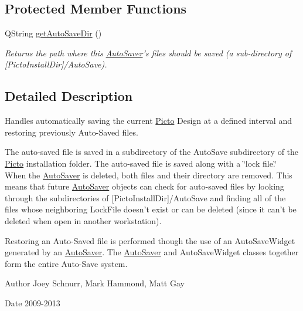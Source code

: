 \subsection*{Protected Member Functions}
\begin{DoxyCompactItemize}
\item 
\hypertarget{class_picto_1_1_auto_saver_a09344b067f544c9f860493e210baf2af}{Q\-String \hyperlink{class_picto_1_1_auto_saver_a09344b067f544c9f860493e210baf2af}{get\-Auto\-Save\-Dir} ()}\label{class_picto_1_1_auto_saver_a09344b067f544c9f860493e210baf2af}

\begin{DoxyCompactList}\small\item\em Returns the path where this \hyperlink{class_picto_1_1_auto_saver}{Auto\-Saver}'s files should be saved (a sub-\/directory of \mbox{[}Picto\-Install\-Dir\mbox{]}/\-Auto\-Save). \end{DoxyCompactList}\end{DoxyCompactItemize}


\subsection{Detailed Description}
Handles automatically saving the current \hyperlink{namespace_picto}{Picto} Design at a defined interval and restoring previously Auto-\/\-Saved files. 

The auto-\/saved file is saved in a subdirectory of the Auto\-Save subdirectory of the \hyperlink{namespace_picto}{Picto} installation folder. The auto-\/saved file is saved along with a \char`\"{}lock file.\char`\"{} When the \hyperlink{class_picto_1_1_auto_saver}{Auto\-Saver} is deleted, both files and their directory are removed. This means that future \hyperlink{class_picto_1_1_auto_saver}{Auto\-Saver} objects can check for auto-\/saved files by looking through the subdirectories of \mbox{[}Picto\-Install\-Dir\mbox{]}/\-Auto\-Save and finding all of the files whose neighboring Lock\-File doesn't exist or can be deleted (since it can't be deleted when open in another workstation).

Restoring an Auto-\/\-Saved file is performed though the use of an Auto\-Save\-Widget generated by an \hyperlink{class_picto_1_1_auto_saver}{Auto\-Saver}. The \hyperlink{class_picto_1_1_auto_saver}{Auto\-Saver} and Auto\-Save\-Widget classes together form the entire Auto-\/\-Save system. \begin{DoxyAuthor}{Author}
Joey Schnurr, Mark Hammond, Matt Gay 
\end{DoxyAuthor}
\begin{DoxyDate}{Date}
2009-\/2013 
\end{DoxyDate}


